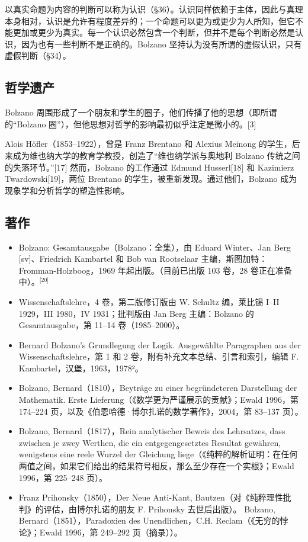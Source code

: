 以真实命题为内容的判断可以称为认识（§36）。认识同样依赖于主体，因此与真理本身相对，认识是允许有程度差异的；一个命题可以更为或更少为人所知，但它不能更加或更少为真实。每一个认识必然包含一个判断，但并不是每个判断必然是认识，因为也有一些判断不是正确的。Bolzano 坚持认为没有所谓的虚假认识，只有虚假判断（§34）。
\subsection{哲学遗产}
Bolzano 周围形成了一个朋友和学生的圈子，他们传播了他的思想（即所谓的“Bolzano 圈”），但他思想对哲学的影响最初似乎注定是微小的。[3]

Alois Höfler（1853–1922），曾是 Franz Brentano 和 Alexius Meinong 的学生，后来成为维也纳大学的教育学教授，创造了“维也纳学派与奥地利 Bolzano 传统之间的失落环节。”[17] 然而，Bolzano 的工作通过 Edmund Husserl[18] 和 Kazimierz Twardowski[19]，两位 Brentano 的学生，被重新发现。通过他们，Bolzano 成为现象学和分析哲学的塑造性影响。
\subsection{著作}
\begin{itemize}
\item Bolzano: Gesamtausgabe（Bolzano：全集），由 Eduard Winter、Jan Berg [sv]、Friedrich Kambartel 和 Bob van Rootselaar 主编，斯图加特：Fromman-Holzboog，1969 年起出版。（目前已出版 103 卷，28 卷正在准备中）。\(^\text{[20]}\)
\item Wissenschaftslehre，4 卷，第二版修订版由 W. Schultz 编，莱比锡 I–II 1929，III 1980，IV 1931；批判版由 Jan Berg 主编：Bolzano 的 Gesamtausgabe，第 11–14 卷（1985–2000）。  
\item Bernard Bolzano's Grundlegung der Logik. Ausgewählte Paragraphen aus der Wissenschaftslehre，第 1 和 2 卷，附有补充文本总结、引言和索引，编辑 F. Kambartel，汉堡，1963，1978²。  
\item Bolzano, Bernard（1810），Beyträge zu einer begründeteren Darstellung der Mathematik. Erste Lieferung（《数学更为严谨展示的贡献》；Ewald 1996，第 174–224 页，以及《伯恩哈德·博尔扎诺的数学著作》，2004，第 83–137 页）。  
\item Bolzano, Bernard（1817），Rein analytischer Beweis des Lehrsatzes, dass zwischen je zwey Werthen, die ein entgegengesetztes Resultat gewähren, wenigstens eine reele Wurzel der Gleichung liege（《纯粹的解析证明：在任何两值之间，如果它们给出的结果符号相反，那么至少存在一个实根》；Ewald 1996，第 225–248 页）。  
\item Franz Prihonsky（1850），Der Neue Anti-Kant, Bautzen（对《纯粹理性批判》的评估，由博尔扎诺的朋友 F. Prihonsky 去世后出版）。  
Bolzano, Bernard（1851），Paradoxien des Unendlichen，C.H. Reclam（《无穷的悖论》；Ewald 1996，第 249–292 页（摘录））。  
\end{itemize}

